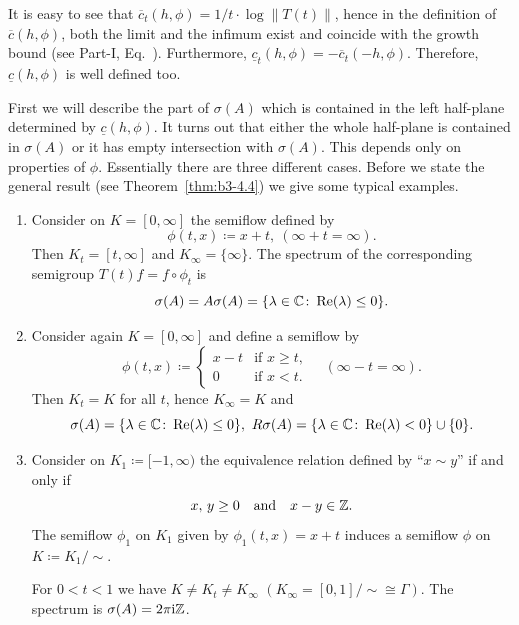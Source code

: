 It is easy to see that $\overline{c}_{t}(h,\phi) = 1/t\cdot\log\|T(t)\|$, hence in the definition of\/ $\overline{c}(h,\phi)$, both the limit and the infimum exist and coincide with the growth bound (see Part-I, Eq.~).
Furthermore, $\underline{c}_{t}(h,\phi) = -\overline{c}_{t}(-h,\phi)$.
Therefore, $\underline{c}(h,\phi)$ is well defined too.

First we will describe the part of\/ $\sigma(A)$ which is contained in the left half-plane determined by $\underline{c}(h,\phi)$.
It turns out that either the whole half-plane is contained in $\sigma(A)$ or it has empty intersection with $\sigma(A)$.
This depends only on properties of\/ $\phi$.
Essentially there 
are three different cases. 
Before we state the general result (see Theorem~\ref{thm:b3-4.4}) we give some typical examples.
\begin{examples}\label{ex:b3-4.3}
	\begin{enumerate}[\upshape (i), wide, labelindent=.25em]
	\item 
	Consider on $K = [0,\infty]$ the semiflow defined by 
    \[
    \phi(t,x) \coloneq x + t,\ (\infty + t = \infty) .
    \]
	Then $K_{t} = [t,\infty]$ and $K_{\infty} = \{\infty\}$.
	The spectrum of the corresponding semigroup $T(t)f = f\circ\phi_{t}$ is 
    \[
    \sigma(A) = A\sigma(A) = 
    \{\lambda \in \C \colon \Re(\lambda) \leq 0\} .
    \]
	
	\item 
	Consider again $K = [0,\infty]$ and define a semiflow by
	\[
	\phi(t,x) \coloneq \begin{cases} 
		x - t & \text{if } x \geq t  , \\
		0 & \text{if } x < t .
	\end{cases} \quad (\infty - t = \infty) .
	\]
	Then $K_{t} = K$ for all $t$, hence $K_{\infty} = K$ and \[
    \sigma(A) = \{\lambda \in \C \colon \Re(\lambda) \leq 0\} ,  \ R\sigma(A) = \{\lambda \in \C \colon \Re(\lambda) < 0\} \cup \{0\} .
    \]
	
	\item 
	Consider on $K_{1} \coloneq [-1,\infty)$ the equivalence relation defined by
\enquote{$x \sim y$} if and only if
\[
    x,\,y \geq 0 \quad\text{and}\quad x - y \in \Z.
\]
The semiflow $\phi_{1}$ on $K_{1}$ given by $\phi_{1}(t,x) = x + t$
induces a semiflow $\phi$ on $K \coloneq K_{1}/{\sim}$.
    
	For $0 < t < 1$ we have $K \neq K_{t} \neq K_{\infty}$ $(K_{\infty} = [0,1]/{\sim} \cong \Gamma)$.
	The spectrum is $\sigma(A) = 2\pi \mathrm{i}\mathbb{Z}$.
	

\end{enumerate}
\end{examples}
